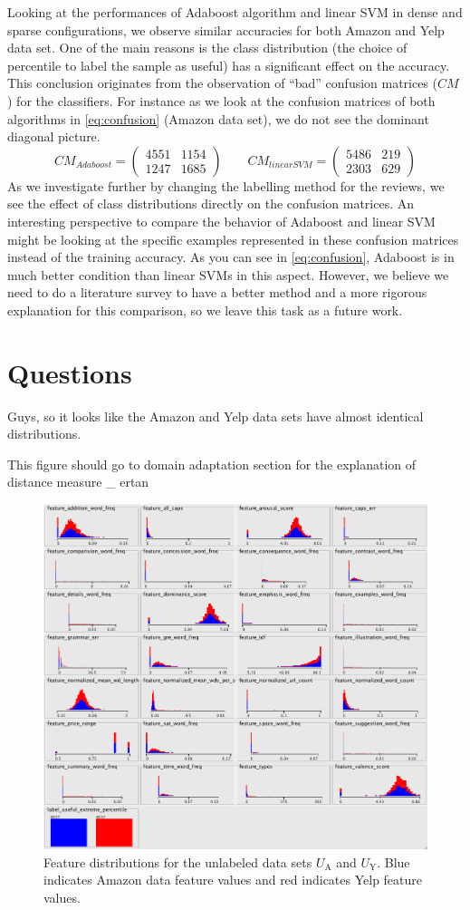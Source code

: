 \documentclass[letterpaper]{article}
\begin{document}
Looking at the performances of Adaboost algorithm and linear SVM in
dense and sparse configurations, we observe similar accuracies for
both Amazon and Yelp data set. One of the main
reasons is the class distribution (the choice of percentile to
label the sample as useful) has a significant
effect on the accuracy. This conclusion originates from the
observation of ``bad'' confusion matrices ($CM$) for the classifiers. For
instance as we look at the confusion matrices of both algorithms in
\ref{eq:confusion} (Amazon data set), we do not see the dominant diagonal
picture. 
\begin{equation}
\label{eq:confusion}
CM_{Adaboost} = \left(
\begin{matrix}
4551 & 1154\\
1247 & 1685
\end{matrix}
\right)
\qquad
CM_{linearSVM} = \left(
\begin{matrix}
5486 & 219\\
2303 & 629
\end{matrix}
\right)
\end{equation}
As we investigate further by changing the labelling method
for the reviews, we see the effect of class distributions directly on
the confusion matrices. An interesting perspective to compare the
behavior of Adaboost and linear SVM might be looking at the specific
examples represented in these confusion matrices instead of the training
accuracy. As you can see in \ref{eq:confusion}, Adaboost is in much
better condition than linear SVMs in this aspect. However, we believe
we need to do a literature survey to have a better method and a more
rigorous explanation
for this comparison, so we leave this task as a future work.

\section{Questions}

Guys, so it looks like the Amazon and Yelp data sets have almost identical distributions.

This figure should go to domain adaptation section for the explanation
of distance measure \_ ertan

\begin{figure}[h]
	\centering
	\includegraphics[width=0.5\linewidth]{adaptation_unlabeled_features}
	\caption{Feature distributions for the unlabeled data sets $U_{\textrm{A}}$ and $U_{\textrm{Y}}$.  
	Blue indicates Amazon data feature values and red indicates Yelp feature values.}
\end{figure}
\end{document}
